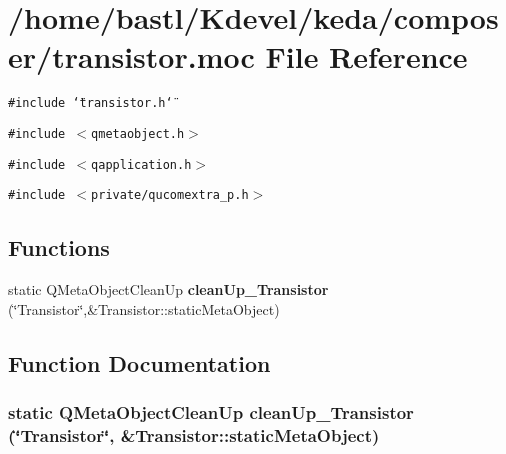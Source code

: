 \section{/home/bastl/Kdevel/keda/composer/transistor.moc File Reference}
\label{transistor_8moc}
{\tt \#include \char`\"{}transistor.h\char`\"{}}\par
{\tt \#include $<$qmetaobject.h$>$}\par
{\tt \#include $<$qapplication.h$>$}\par
{\tt \#include $<$private/qucomextra\_\-p.h$>$}\par
\subsection*{Functions}
\begin{CompactItemize}
\item 
static QMeta\-Object\-Clean\-Up {\bf clean\-Up\_\-Transistor} (\char`\"{}Transistor\char`\"{},\&Transistor::static\-Meta\-Object)
\end{CompactItemize}


\subsection{Function Documentation}
\subsubsection{\setlength{\rightskip}{0pt plus 5cm}static QMeta\-Object\-Clean\-Up clean\-Up\_\-Transistor (\char`\"{}Transistor\char`\"{}, \&Transistor::static\-Meta\-Object)\hspace{0.3cm}{\tt  [static]}}\label{transistor_8moc_bb2ee6d4700fa9cab0a8c3575711a511}


